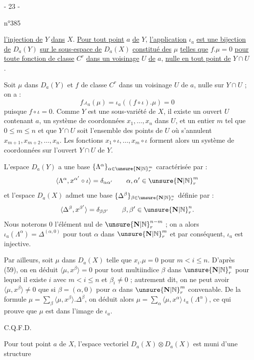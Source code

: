 \begin{center}- 23 -\end{center}
\begin{flushright}n°385\end{flushright}

\uline{l'injection de} $Y$ \uline{dans} $X$. \uline{Pour tout point} $a$ \uline{de} $Y$, \uline{l'application} $\iota_a$ \uline{est une bijection de} $D_a(Y)$ \uline{sur le sous-espace de} $D_a(X)$ \uline{constitué des} $\mu$ \uline{telles que} $f.\mu=0$ \uline{pour toute fonction de classe} $C^r$ \uline{dans un voisinage} $U$ \uline{de} $a$, \uline{nulle en tout point de} $Y\cap U$.

Soit $\mu$ dans $D_a(Y)$ et $f$ de classe $C^r$ dans un voisinage $U$ de $a$, nulle sur $Y\cap U$ ; on a :
\[
f.\iota_a(\mu)=\iota_a((f\circ\iota).\mu)=0
\]
puisque $f\circ\iota=0$. Comme $Y$ est une sous-variété de $X$, il existe un ouvert $U$ contenant $a$, un système de coordonnées $x_1,\ldots,x_n$ dans $U$, et un entier $m$ tel que $0\leq m\leq n$ et que $Y\cap U$ soit l'ensemble des points de $U$ où s'annulent $x_{m+1},x_{m+2},\ldots,x_n$. Les fonctions $x_1\circ\iota,\ldots,x_m\circ\iota$ forment alors un système de coordonnées sur l'ouvert $Y\cap U$ de $Y$.

L'espace $D_a(Y)$ a une base $\{\Lambda^\alpha\}_{\alpha\in\unsure{\mathbf{N}|\mathbb{N}}_r^m}$ caractérisée par :
\[
\langle\Lambda^\alpha,x^{\alpha'}\circ\iota\rangle=\delta_{\alpha\alpha'}
\qquad \alpha,\alpha'\in\unsure{\mathbf{N}|\mathbb{N}}_r^m
\]
et l'espace $D_a(X)$ admet une base $\{\Delta^\beta\}_{\beta\in\unsure{\mathbf{N}|\mathbb{N}}_r^n}$ définie par :
\[
\langle\Delta^\beta,x^{\beta'}\rangle=\delta_{\beta\beta'}
\qquad \beta,\beta'\in\unsure{\mathbf{N}|\mathbb{N}}_r^n.
\]
Nous noterons $0$ l'élément nul de $\unsure{\mathbf{N}|\mathbb{N}}_r^{n-m}$ ; on a alors $\iota_a(\Lambda^\alpha)=\Delta^{(\alpha,0)}$ pour tout $\alpha$ dans $\unsure{\mathbf{N}|\mathbb{N}}_r^m$ et par conséquent, $\iota_a$ est injective.

Par ailleurs, soit $\mu$ dans $D_a(X)$ telle que $x_i.\mu=0$ pour $m<i\leq n$. D'après (59), on en déduit $\langle\mu,x^\beta\rangle=0$ pour tout multiindice $\beta$ dans $\unsure{\mathbf{N}|\mathbb{N}}_r^n$ pour lequel il existe $i$ avec $m<i\leq n$ et $\beta_i\neq0$ ; autrement dit, on ne peut avoir $\langle\mu,x^\beta\rangle\neq0$ que si $\beta=(\alpha,0)$ pour $\alpha$ dans $\unsure{\mathbf{N}|\mathbb{N}}_r^m$ convenable. De la formule $\mu=\sum_\beta\langle\mu,x^\beta\rangle.\Delta^\beta$, on déduit alors $\mu=\sum_\alpha\langle\mu,x^\alpha\rangle\,\iota_a(\Lambda^\alpha)$, ce qui prouve que $\mu$ est dans l'image de $\iota_a$.
\begin{flushright}C.Q.F.D.\end{flushright}

Pour tout point $a$ de $X$, l'espace vectoriel $D_a(X)\otimes D_a(X)$ est muni d'une structure
